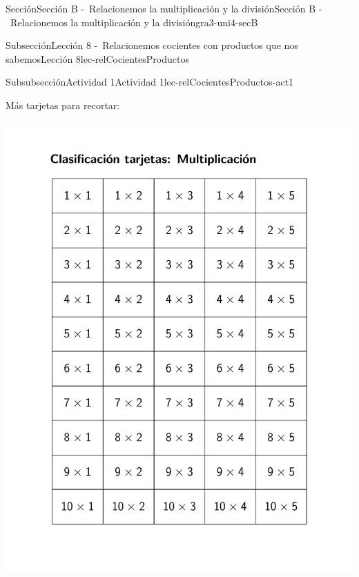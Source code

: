 \begin{sectionptx}{Sección}{Sección B -~Relacionemos la multiplicación y la división}{}{Sección B -~Relacionemos la multiplicación y la división}{}{}{gra3-uni4-secB}
\begin{subsectionptx}{Subsección}{Lección 8 -~Relacionemos cocientes con productos que nos sabemos}{}{Lección 8}{}{}{lec-relCocientesProductos}
\begin{subsubsectionptx}{Subsubsección}{Actividad 1}{}{Actividad 1}{}{}{lec-relCocientesProductos-act1}
\begin{cutoutpage}
\cleardoublepage
Más tarjetas para recortar:
\par
\includegraphics[page=2, trim=70 80 80 100,clip, width=1.05\linewidth]{external/blm/tikz-source/clasificacionTarjetas-multiplicacion-blm.pdf}
\end{cutoutpage}


\end{subsubsectionptx}
\end{subsectionptx}
\end{sectionptx}
